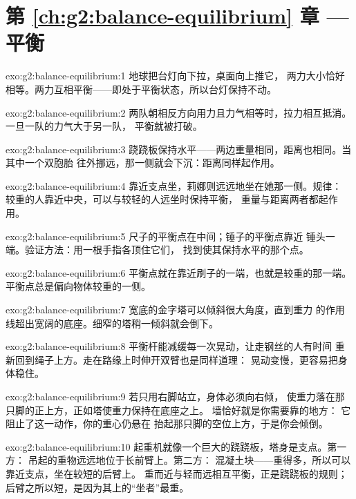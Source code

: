 \section*{第 \ref{ch:g2:balance-equilibrium} 章 --- 平衡}

\begin{solution}{exo:g2:balance-equilibrium:1}
地球把台灯向下拉，桌面向上推它，
两力大小恰好相等。两力互相平衡——即处于平衡状态，所以台灯保持不动。
\end{solution}

\begin{solution}{exo:g2:balance-equilibrium:2}
两队朝相反方向用力且力气相等时，拉力相互抵消。
一旦一队的力气大于另一队，
平衡就被打破。
\end{solution}

\begin{solution}{exo:g2:balance-equilibrium:3}
跷跷板保持水平——两边重量相同，距离也相同。当其中一个双胞胎
往外挪远，那一侧就会下沉：距离同样起作用。
\end{solution}

\begin{solution}{exo:g2:balance-equilibrium:4}
靠近支点坐，莉娜则远远地坐在她那一侧。规律：
较重的人靠近中央，可以与较轻的人远坐时保持平衡，
重量与距离两者都起作用。
\end{solution}

\begin{solution}{exo:g2:balance-equilibrium:5}
尺子的平衡点在中间；锤子的平衡点靠近
锤头一端。验证方法：用一根手指各顶住它们，
找到使其保持水平的那个点。
\end{solution}

\begin{solution}{exo:g2:balance-equilibrium:6}
平衡点就在靠近刷子的一端，也就是较重的那一端。
平衡点总是偏向物体较重的一侧。
\end{solution}

\begin{solution}{exo:g2:balance-equilibrium:7}
宽底的金字塔可以倾斜很大角度，直到重力
的作用线超出宽阔的底座。细窄的塔稍一倾斜就会倒下。
\end{solution}

\begin{solution}{exo:g2:balance-equilibrium:8}
平衡杆能减缓每一次晃动，让走钢丝的人有时间
重新回到绳子上方。走在路缘上时伸开双臂也是同样道理：
晃动变慢，更容易把身体稳住。
\end{solution}

\begin{solution}{exo:g2:balance-equilibrium:9}
若只用右脚站立，身体必须向右倾，
使重力落在那只脚的正上方，正如塔使重力保持在底座之上。
墙恰好就是你需要靠的地方：
它阻止了这一动作，你的重心仍悬在
抬起那只脚的空位上方，于是你会倾倒。
\end{solution}

\begin{solution}{exo:g2:balance-equilibrium:10}
起重机就像一个巨大的跷跷板，塔身是支点。第一方：
吊起的重物远远地位于长前臂上。第二方：
混凝土块——重得多，所以可以靠近支点，坐在较短的后臂上。
重而近与轻而远相互平衡，正是跷跷板的规则；
后臂之所以短，是因为其上的“坐者”最重。
\end{solution}
